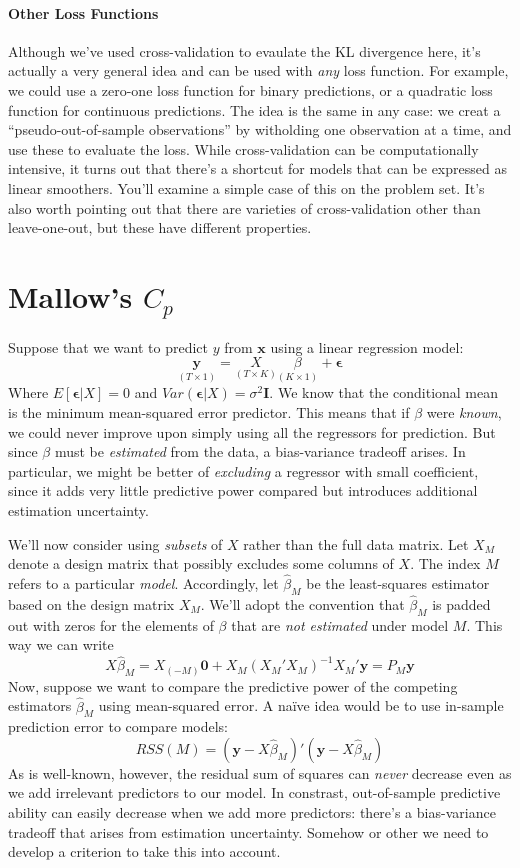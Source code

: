 \documentclass[12pt]{article}
\theoremstyle{definition}
\begin{document}
\paragraph{Other Loss Functions} Although we've used cross-validation to evaulate the KL divergence here, it's actually a very general idea and can be used with \emph{any} loss function. For example, we could use a zero-one loss function for binary predictions, or a quadratic loss function for continuous predictions. The idea is the same in any case: we creat a ``pseudo-out-of-sample observations'' by witholding one observation at a time, and use these to evaluate the loss. While cross-validation can be computationally intensive, it turns out that there's a shortcut for models that can be expressed as linear smoothers. You'll examine a simple case of this on the problem set. It's also worth pointing out that there are varieties of cross-validation other than leave-one-out, but these have different properties. 



\section{Mallow's $C_p$}
Suppose that we want to predict $y$ from $\mathbf{x}$ using a linear regression model:
	$$\underset{(T\times1)}{\textbf{y}} = \underset{(T\times K)}{X} \underset{(K\times 1)}{\beta} + \boldsymbol{\epsilon}$$
Where $E[\boldsymbol{\epsilon}|X] = 0$ and $Var(\boldsymbol{\epsilon}|X) = \sigma^2 \mathbf{I}$. We know that the conditional mean is the minimum mean-squared error predictor. This means that if $\beta$ were \emph{known}, we could never improve upon simply using all the regressors for prediction. But since $\beta$ must be \emph{estimated} from the data, a bias-variance tradeoff arises. In particular, we might be better of \emph{excluding} a regressor with small coefficient, since it adds very little predictive power compared but introduces additional estimation uncertainty. 

We'll now consider using \emph{subsets} of $X$ rather than the full data matrix. Let $X_M$ denote a design matrix that possibly excludes some columns of $X$. The index $M$ refers to a particular \emph{model}. Accordingly, let $\widehat{\beta}_M$ be the least-squares estimator based on the design matrix $X_M$. We'll adopt the convention that $\widehat{\beta}_M$ is padded out with zeros for the elements of $\beta$ that are \emph{not estimated} under model $M$. This way we can write
	$$X\widehat{\beta}_M = X_{(-M)}\textbf{0} + X_M (X_M'X_M)^{-1} X_M'\textbf{y} = P_M \textbf{y}$$
Now, suppose we want to compare the predictive power of the competing estimators $\widehat{\beta}_M$ using mean-squared error. A na\"{i}ve idea would be to use in-sample prediction error to compare models:
	$$RSS(M) = (\textbf{y} - X\widehat{\beta}_M)'(\textbf{y} - X\widehat{\beta}_M)$$
As is well-known, however, the residual sum of squares can \emph{never} decrease even as we add irrelevant predictors to our model. In constrast, out-of-sample predictive ability can easily decrease when we add more predictors: there's a bias-variance tradeoff that arises from estimation uncertainty. Somehow or other we need to develop a criterion to take this into account.
\end{document}

